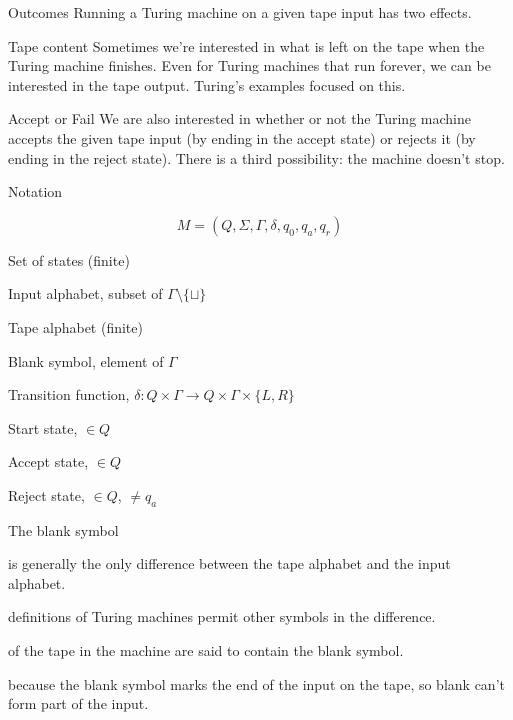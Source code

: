 \begin{frame}{Outcomes}
  Running a Turing machine on a given tape input has two effects.

  \begin{alertblock}{Tape content}
    Sometimes we're interested in what is left on the tape when the Turing machine finishes. Even for Turing machines that run forever, we can be interested in the tape output. Turing's examples focused on this.
  \end{alertblock}

  \begin{alertblock}{Accept or Fail}
    We are also interested in whether or not the Turing machine accepts the given tape input (by ending in the accept state) or rejects it (by ending in the reject state). There is a third possibility: the machine doesn't stop.
  \end{alertblock}
\end{frame}


\begin{frame}{Notation}
  \begin{topdisp}
    $$M = (Q, \Sigma, \Gamma, \delta , q_0, q_a, q_r )$$
  \end{topdisp}
  \begin{description}[aaaaaaaa]
    \item[$Q$] Set of states (finite)
    \item[$\Sigma$] Input alphabet, subset of $\Gamma \setminus \{ \sqcup \} $
    \item[$\Gamma$] Tape alphabet (finite)
    \item[$\sqcup$] Blank symbol, element of $\Gamma$
    \item[$\delta$] Transition function, $\delta: Q \times \Gamma \rightarrow Q \times \Gamma \times \{L,R\}$
    \item[$q_0$] Start state, $\in Q$
    \item[$q_a$] Accept state, $\in Q$
    \item[$q_r$] Reject state, $\in Q$, $\neq q_a$
  \end{description}
\end{frame}


\begin{frame}{The blank symbol}
  \begin{description}
    \setlength\itemsep{4mm}
    \item[\bl] is generally the only difference between the tape alphabet and the input alphabet.
    \item[Some] definitions of Turing machines permit other symbols in the difference.
    \item[Empty cells] of the tape in the machine are said to contain the blank symbol.
    \item[Important] because the blank symbol marks the end of the input on the tape, so blank can't form part of the input.
  \end{description}
\end{frame}



